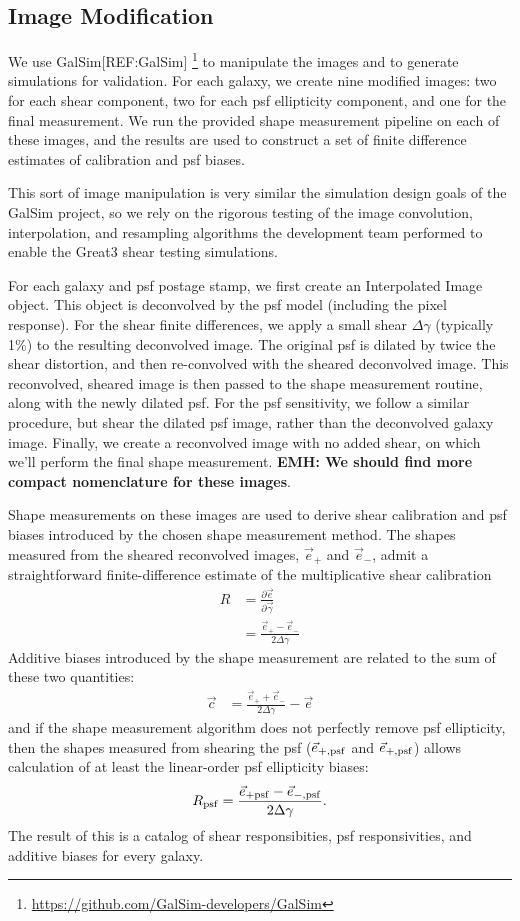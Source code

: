 \documentclass[iop]{emulateapj}
\begin{document}
\subsection{Image Modification}
We use GalSim[REF:GalSim] \footnote{\url{https://github.com/GalSim-developers/GalSim}} to manipulate the images and to generate simulations for validation. For each galaxy, we create nine modified images: two for each shear component, two for each psf ellipticity component, and one for the final measurement. We run the provided shape measurement pipeline on each of these images, and the results are used to construct a set of finite difference estimates of calibration and psf biases.

This sort of image manipulation is very similar the simulation design goals of the GalSim  project, so we rely on the rigorous testing of the image convolution, interpolation, and resampling algorithms the development team performed to enable the Great3 shear testing simulations.

For each galaxy and psf postage stamp, we first create an Interpolated Image object. This object is deconvolved by the psf model (including the pixel response). For the shear finite differences, we apply a small shear $\Delta\gamma$ (typically 1\%) to the resulting deconvolved image. The original psf is dilated by twice the shear distortion, and then re-convolved with the sheared deconvolved image. This reconvolved, sheared image is then passed to the shape measurement routine, along with the newly dilated psf. For the psf sensitivity, we follow a similar procedure, but shear the dilated psf image, rather than the deconvolved galaxy image. Finally, we create a reconvolved image with no added shear, on which we'll perform the final shape measurement. {\bf EMH: We should find more compact nomenclature for these images}.

Shape measurements on these images are used to derive shear calibration and psf biases {introduced by the chosen shape measurement method}. The shapes measured from the  sheared reconvolved images, $\vec{e}_{+}$ and $\vec{e}_{-}$, admit a straightforward finite-difference estimate of the multiplicative shear calibration
\begin{align}
R &= \frac{\partial \vec{e}}{\partial \vec{\gamma}}  \\
 &=\frac{\vec{e}_{+} - \vec{e}_{-}}{2\Delta\gamma}
\end{align}
Additive biases introduced by the shape measurement are related to the sum of these two quantities:
\begin{align}
\vec{c} &= \frac{\vec{e}_{+} + \vec{e}_{-}}{2 \Delta\gamma} - \vec{e}
\end{align}
and if the shape measurement algorithm does not perfectly remove psf ellipticity, then the shapes measured from shearing the psf ($\vec{e}_{+,\rm psf}$ and $\vec{e}_{+,\rm psf}$) allows calculation of at least the linear-order psf ellipticity biases:
\begin{align}
R_{\rm psf} = \frac{\vec{e}_{+\rm psf} - \vec{e}_{-,\rm psf}}{2\Delta\gamma}.
\end{align}
The result of this is a catalog of shear responsibities, psf responsivities, and additive biases for every galaxy.
\end{document}
